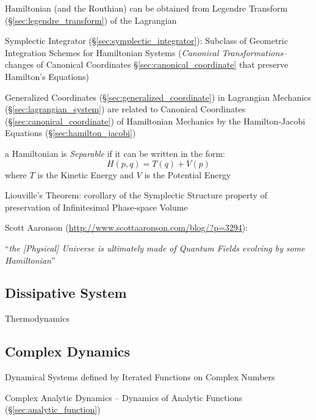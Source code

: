 Hamiltonian (and the Routhian) can be obtained from Legendre Transform
(\S\ref{sec:legendre_transform}) of the Lagrangian

\fist Symplectic Integrator (\S\ref{sec:symplectic_integrator}): Subclass of
Geometric Integration Schemes for Hamiltonian Systems (\emph{Canonical
  Transformations}-- changes of Canonical Coordinates
\S\ref{sec:canonical_coordinate} that preserve Hamilton's Equations)

Generalized Coordinates (\S\ref{sec:generalized_coordinate}) in Lagrangian
Mechanics (\S\ref{sec:lagrangian_system}) are related to Canonical Coordinates
(\S\ref{sec:canonical_coordinate}) of Hamiltonian Mechanics by the
Hamilton-Jacobi Equations (\S\ref{sec:hamilton_jacobi})

a Hamiltonian is \emph{Separable} if it can be written in the form:
\[
  H(p,q) = T(q) + V(p)
\]
where $T$ is the Kinetic Energy and $V$ is the Potential Energy

Liouville's Theorem: corollary of the Symplectic Structure property of
preservation of Infinitesimal Phase-space Volume

Scott Aaronson (\url{http://www.scottaaronson.com/blog/?p=3294}):

``\emph{the [Physical] Universe is ultimately made of Quantum Fields
  evolving by some Hamiltonian}''



\subsection{Dissipative System}\label{sec:dissipative_system}

Thermodynamics



\subsection{Complex Dynamics}\label{sec:complex_dynamics}

Dynamical Systems defined by Iterated Functions on Complex Numbers

Complex Analytic Dynamics -- Dynamics of Analytic Functions
(\S\ref{sec:analytic_function})

